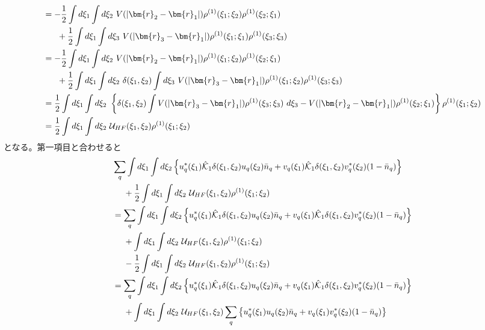 \documentclass[dvipdfmx, 11pt, a4paper]{jsarticle}
\numberwithin{equation}{section}
\theoremstyle{definition}
\begin{document}
\begin{derivationBox}
\begin{align}
            &= -\frac{1}{2}\int d\xi_1\int d\xi_2\ V(\left| \bm{r}_2-\bm{r}_1 \right|)\rho^{(1)}(\xi_1;\xi_2) \rho^{(1)}(\xi_2;\xi_1) \notag \\
            &\ \ \ \ \ +\frac{1}{2}\int d\xi_1\int d\xi_3\ V(\left| \bm{r}_3-\bm{r}_1 \right|)\rho^{(1)}(\xi_1;\xi_1)\rho^{(1)}(\xi_3;\xi_3) \notag \\
            &= -\frac{1}{2}\int d\xi_1\int d\xi_2\ V(\left| \bm{r}_2-\bm{r}_1 \right|)\rho^{(1)}(\xi_1;\xi_2) \rho^{(1)}(\xi_2;\xi_1) \notag \\
            &\ \ \ \ \ +\frac{1}{2}\int d\xi_1 \int d\xi_2\ \delta(\xi_1,\xi_2)\int d\xi_3\ V(\left| \bm{r}_3-\bm{r}_1 \right|)\rho^{(1)}(\xi_1;\xi_2)\rho^{(1)}(\xi_3;\xi_3) \notag \\
            &=\frac{1}{2}\int d\xi_1\int d\xi_2\ \left\{  \delta(\xi_1,\xi_2)\int  V(\left| \bm{r}_3-\bm{r}_1 \right|)\rho^{(1)}(\xi_3;\xi_3)\ d\xi_3 - V(\left| \bm{r}_2-\bm{r}_1 \right|)\rho^{(1)}(\xi_2;\xi_1)\right\}\rho^{(1)}(\xi_1;\xi_2) \notag \\
            &=\frac{1}{2}\int d\xi_1\int d\xi_2\ \mathcal{U}_{HF}(\xi_1,\xi_2)\rho^{(1)}(\xi_1;\xi_2)
        \end{align}
        となる。第一項目と合わせると
        \begin{align}
            & \sum_q\int d\xi_1 \int d\xi_2 \left\{  u_q^*(\xi_1)\hat{\mathcal{K}}_1 \delta(\xi_1,\xi_2)u_q(\xi_2)\bar{n}_q+v_q(\xi_1)\hat{\mathcal{K}}_1\delta(\xi_1,\xi_2)v_q^*(\xi_2)(1-\bar{n}_q) \right\}   \notag \\
            &\ \ \ \ + \frac{1}{2}\int d\xi_1\int d\xi_2\ \mathcal{U}_{HF}(\xi_1,\xi_2)\rho^{(1)}(\xi_1;\xi_2) \notag \\
            &= \sum_q\int d\xi_1 \int d\xi_2 \left\{  u_q^*(\xi_1)\hat{\mathcal{K}}_1 \delta(\xi_1,\xi_2)u_q(\xi_2)\bar{n}_q+v_q(\xi_1)\hat{\mathcal{K}}_1\delta(\xi_1,\xi_2)v_q^*(\xi_2)(1-\bar{n}_q) \right\}   \notag \\
            &\ \ \ \ + \int d\xi_1\int d\xi_2\ \mathcal{U}_{HF}(\xi_1,\xi_2)\rho^{(1)}(\xi_1;\xi_2) \notag \\
            &\ \ \ \ - \frac{1}{2}\int d\xi_1\int d\xi_2\ \mathcal{U}_{HF}(\xi_1,\xi_2)\rho^{(1)}(\xi_1;\xi_2) \notag \\
            &= \sum_q\int d\xi_1 \int d\xi_2 \left\{  u_q^*(\xi_1)\hat{\mathcal{K}}_1 \delta(\xi_1,\xi_2)u_q(\xi_2)\bar{n}_q+v_q(\xi_1)\hat{\mathcal{K}}_1\delta(\xi_1,\xi_2)v_q^*(\xi_2)(1-\bar{n}_q) \right\}   \notag \\
            &\ \ \ \ + \int d\xi_1\int d\xi_2\ \mathcal{U}_{HF}(\xi_1,\xi_2)\sum_q\left\{ u_q^*(\xi_1)u_q(\xi_2)\bar{n}_q+v_q(\xi_1)v_q^*(\xi_2)(1-\bar{n}_q) \right\} \notag \\

\end{align}
\end{derivationBox}
\end{document}
